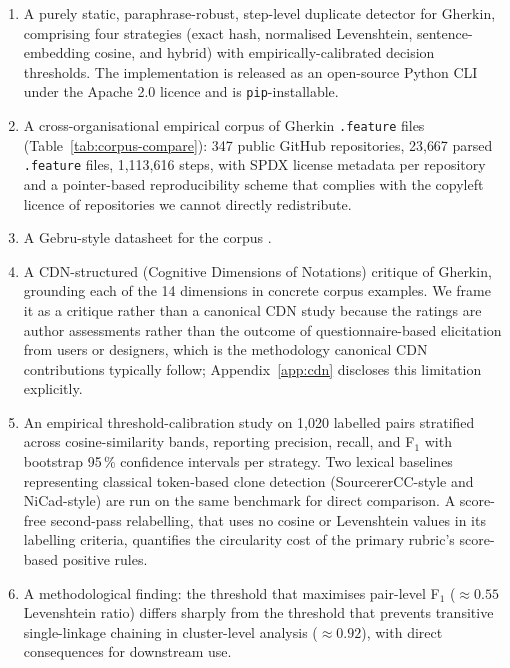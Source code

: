 \documentclass[11pt,a4paper]{article}
\begin{document}
\begin{enumerate}[leftmargin=2em]
  \item A purely static, paraphrase-robust, step-level duplicate
        detector for Gherkin, comprising four strategies (exact hash,
        normalised Levenshtein, sentence-embedding cosine, and
        hybrid) with empirically-calibrated decision thresholds. The
        implementation is released as an open-source Python CLI under
        the Apache 2.0 licence and is \texttt{pip}-installable.
  \item A cross-organisational empirical corpus of Gherkin
        \texttt{.feature} files (Table~\ref{tab:corpus-compare}): 347
        public GitHub repositories, 23{,}667 parsed
        \texttt{.feature} files, 1{,}113{,}616 steps, with SPDX
        license metadata per repository and a pointer-based
        reproducibility scheme that complies with the copyleft licence
        of repositories we cannot directly redistribute.
  \item A Gebru-style datasheet for the corpus \citep{gebru2021datasheets}.
  \item A CDN-structured (Cognitive Dimensions of Notations)
        critique of Gherkin, grounding each of the 14 dimensions in
        concrete corpus examples. We frame it as a critique rather
        than a canonical CDN study because the ratings are author
        assessments rather than the outcome of questionnaire-based
        elicitation from users or designers, which is the methodology
        canonical CDN contributions typically follow;
        Appendix~\ref{app:cdn} discloses this limitation explicitly.
  \item An empirical threshold-calibration study on 1{,}020 labelled pairs
        stratified across cosine-similarity bands, reporting precision,
        recall, and F$_1$ with bootstrap 95\,\% confidence intervals per
        strategy. Two lexical baselines representing classical
        token-based clone detection (SourcererCC-style and NiCad-style)
        are run on the same benchmark for direct comparison. A
        score-free second-pass relabelling, that uses no cosine or
        Levenshtein values in its labelling criteria, quantifies the
        circularity cost of the primary rubric's score-based positive
        rules.
  \item A methodological finding: the threshold that maximises pair-level
        F$_1$ (\(\approx 0.55\) Levenshtein ratio) differs sharply from
        the threshold that prevents transitive single-linkage chaining
        in cluster-level analysis (\(\approx 0.92\)), with direct
        consequences for downstream use.
\end{enumerate}
\end{document}
